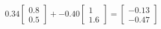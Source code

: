 \documentclass[preview]{standalone}
\begin{document}
\begin{align*}
0.34 \begin{bmatrix} 0.8 \\ 0.5 \end{bmatrix} + -0.40 \begin{bmatrix} 1 \\ 1.6 \end{bmatrix} = \begin{bmatrix} -0.13 \\ -0.47 \end{bmatrix}
\end{align*}
\end{document}
